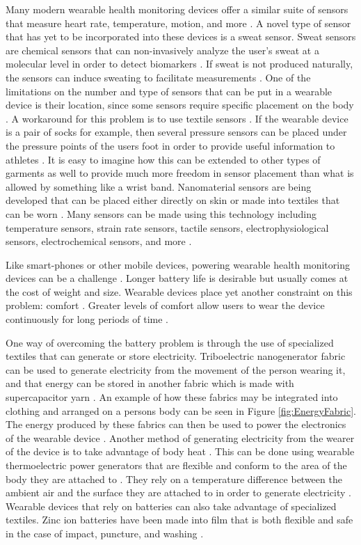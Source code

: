 Many modern wearable health monitoring devices offer a similar suite of sensors
that measure heart rate, temperature, motion, and more
\cite{Seneviratne2017}.  A novel type of sensor that has yet to be incorporated
into these devices is a sweat sensor.  Sweat sensors are chemical sensors that
can non-invasively analyze the user's sweat at a molecular level in order to
detect biomarkers \cite{Tai2018}.  If sweat is not produced naturally, the 
sensors can induce sweating to facilitate measurements \cite{Tai2018}.  One of 
the limitations on the number and type of sensors that can be put in a wearable 
device is their location, since some sensors require specific placement on the
body \cite{Baig2017}.  A workaround for this problem is to use textile sensors 
\cite{Hatamie2020}.  If the wearable device is a pair of socks for example, 
then several pressure sensors can be placed under the pressure points of the 
users foot in order to provide useful information to athletes \cite{Hatamie2020}.
It is easy to imagine how this can be extended to other types of garments as well
to provide much more freedom in sensor placement than what is allowed by something 
like a wrist band.  Nanomaterial sensors are being developed that can be placed either directly 
on skin or made into textiles that can be worn \cite{Yai2018}.  Many sensors can 
be made using this technology including temperature sensors, strain rate sensors, 
tactile sensors, electrophysiological sensors, electrochemical sensors, and more 
\cite{Yai2018}.

Like smart-phones or other mobile devices, powering wearable health monitoring
devices can be a challenge \cite{Pantelopoulos2010}.  Longer battery life is 
desirable but usually comes at the cost of weight and size.  
Wearable devices place yet another constraint on this problem: comfort 
\cite{Motti2014}.  Greater levels of comfort allow users to wear the device 
continuously for long periods of time \cite{Motti2014}.  

One way of overcoming the battery problem is through the use of specialized 
textiles that can generate or store electricity.  Triboelectric 
nanogenerator fabric can be used to generate electricity from the movement of 
the person wearing it, and that energy can be stored in another fabric which 
is made with supercapacitor yarn \cite{Pu2016}. An example of how these fabrics 
may be integrated into clothing and arranged on a persons body can be seen in 
Figure \ref{fig:EnergyFabric}.  The energy produced by these fabrics can then 
be used to power the electronics of the wearable device \cite{Pu2016}.  Another 
method of generating electricity from the wearer of the device is to take 
advantage of body heat \cite{Siddique2017}. This can be done using wearable 
thermoelectric power generators that are flexible and conform to the area of the 
body they are attached to \cite{Siddique2017}.  They rely on a temperature 
difference between the ambient air and the surface they are attached to in order 
to generate electricity \cite{Siddique2017}.  Wearable devices that rely on 
batteries can also take advantage of specialized textiles.  Zinc ion batteries 
have been made into film that is both flexible and safe in the case of impact, 
puncture, and washing \cite{Li2018}.

